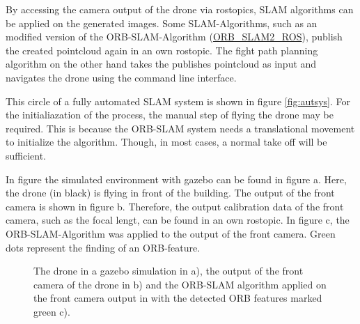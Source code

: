 	By accessing the camera output of the drone via rostopics, SLAM algorithms can be applied on the generated images. Some SLAM-Algorithms, 
	such as an modified version of the ORB-SLAM-Algorithm (\href{https://github.com/rayvburn/ORB-SLAM2_ROS}{ORB\_SLAM2\_ROS}), publish the created pointcloud again in an own rostopic.
	The fight path planning algorithm on the other hand takes the publishes pointcloud as input and navigates the drone using the command line interface. 
	
	This circle of a fully automated SLAM system is shown in figure \ref{fig:autsys}. For the initialiazation of the process, the manual step of flying
	the drone may be required. This is because the ORB-SLAM system needs a translational movement to initialize the algorithm. Though, in most cases, 
	a normal take off will be sufficient. 
	
	
	In figure \cite{fig:simfigs} the simulated environment with gazebo can be found in figure a. Here, the drone (in black) is flying in front of the building. 
	The output of the front camera is shown in figure b. Therefore, the output calibration data of the front camera, such as the focal lengt, 
	can be found in an own rostopic. In figure c, the ORB-SLAM-Algorithm was applied to the output of the front camera. Green dots represent the 
	finding of an ORB-feature. 
	
	
	\begin{figure}%
    \centering
    \qquad
	\qquad
    \caption{
	The drone in a gazebo simulation in a), the output of the front camera of the drone in b) and
	the ORB-SLAM algorithm applied on the front camera output in with the detected ORB features marked green c).
	}%
    \label{fig:simfigs}%
	\end{figure}
	
